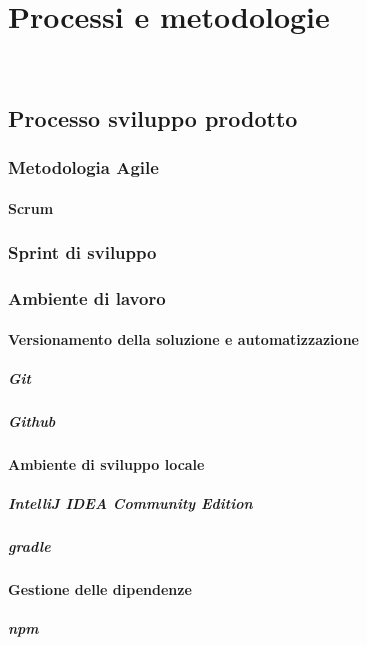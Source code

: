 
\chapter{Processi e metodologie}
\label{cap:processi-metodologie}

\\

\section{Processo sviluppo prodotto}

\subsection{Metodologia Agile}
\subsubsection{Scrum}
\subsection{Sprint di sviluppo}
\subsection{Ambiente di lavoro}
\subsubsection{Versionamento della soluzione e automatizzazione}
\paragraph{Git}
\paragraph{Github}
\subsubsection{Ambiente di sviluppo locale}
\paragraph{IntelliJ IDEA Community Edition}
\paragraph{gradle}
\subsubsection{Gestione delle dipendenze}
\paragraph{npm}